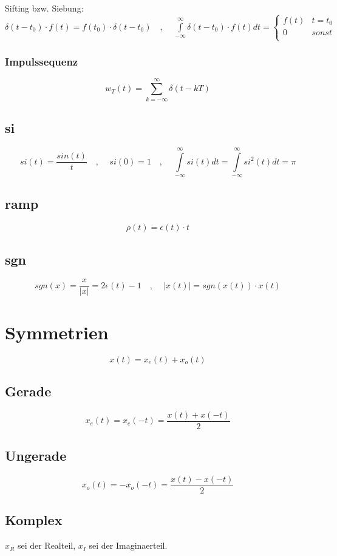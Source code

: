 \documentclass[10pt,a4paper]{article}
\begin{document}
Sifting bzw. Siebung: $\delta(t-t_0)\cdot f(t) = f(t_0)\cdot \delta(t-t_0) \,\,\,\,\,\,,\,\,\,\,\,\,\,
\int\limits_{-\infty}^\infty \delta(t-t_0)\cdot f(t) dt  =
\begin{cases}
f(t) & t = t_0 \\
0 & sonst \\
\end{cases}$

\subsubsection{Impulssequenz}
\[
w_T(t) = \sum\limits_{k=-\infty}^\infty \delta(t-kT)
\]

\subsection{si}
\[
si(t) = \frac{sin(t)}{t}\,\,\,\,\,\,,\,\,\,\,\,\,\, si(0) = 1\,\,\,\,\,\,,\,\,\,\,\,\,\, \int\limits_{-\infty}^\infty si(t) dt= \int\limits_{-\infty}^\infty si^2(t) dt = \pi
\]

\subsection{ramp}
\[ \rho(t) = \epsilon(t)\cdot t \]

\subsection{sgn}
\[ sgn(x) = \frac{x}{|x|} = 2 \epsilon(t) -1 \,\,\,\,\,\,,\,\,\,\,\,\,\, |x(t)| = sgn(x(t)) \cdot x(t) \]

\section{Symmetrien}
\[x(t) = x_e(t) + x_o(t)\]
\subsection{Gerade}
\[ x_e(t) = x_e(-t) = \frac{x(t)+x(-t)}{2}
\]
\subsection{Ungerade}
\[ x_o(t) = -x_o(-t) = \frac{x(t)-x(-t)}{2}
\]

\subsection{Komplex}
$x_R$ sei der Realteil, $x_I$ sei der Imaginaerteil.
\end{document}
